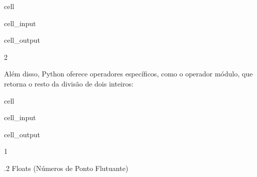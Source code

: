 \documentclass[letterpaper,10pt,english]{jupyterBook}
\begin{document}
\begin{sphinxuseclass}{cell}\begin{sphinxVerbatimInput}

\begin{sphinxuseclass}{cell_input}
\begin{sphinxVerbatim}[commandchars=\\\{\}]
    
\end{sphinxVerbatim}

\end{sphinxuseclass}\end{sphinxVerbatimInput}
\begin{sphinxVerbatimOutput}

\begin{sphinxuseclass}{cell_output}
\begin{sphinxVerbatim}[commandchars=\\\{\}]
\PYGZhy{}2
\end{sphinxVerbatim}

\end{sphinxuseclass}\end{sphinxVerbatimOutput}

\end{sphinxuseclass}
\sphinxAtStartPar
Além disso, Python oferece operadores específicos, como o operador módulo, que retorna o resto da divisão de dois inteiros:

\begin{sphinxuseclass}{cell}\begin{sphinxVerbatimInput}

\begin{sphinxuseclass}{cell_input}
\begin{sphinxVerbatim}[commandchars=\\\{\}]
    
\end{sphinxVerbatim}

\end{sphinxuseclass}\end{sphinxVerbatimInput}
\begin{sphinxVerbatimOutput}

\begin{sphinxuseclass}{cell_output}
\begin{sphinxVerbatim}[commandchars=\\\{\}]
\PYGZhy{}1
\end{sphinxVerbatim}

\end{sphinxuseclass}\end{sphinxVerbatimOutput}

\end{sphinxuseclass}
.2 Floats (Números de Ponto Flutuante)
\end{document}
